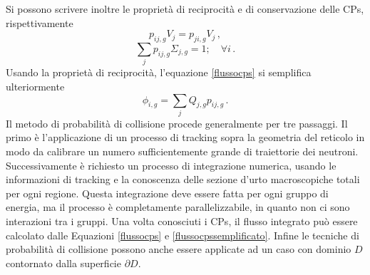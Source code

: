 Si possono scrivere inoltre le proprietà di reciprocità e di conservazione delle 
CPs, rispettivamente
\begin{equation}
p_{ij,g}V_j=p_{ji,g}V_j \,,
\end{equation}
\begin{equation}
\sum_j p_{ij,g}\Sigma_{j,g}=1; \quad \forall i \,.
\end{equation}
Usando la proprietà di reciprocità, l'equazione \eqref{flussocps} si semplifica 
ulteriormente
\begin{equation}
\label{flussocpssemplificato}
\phi_{i,g}=\sum_j Q_{j,g}p_{ij,g} \,.
\end{equation}
Il metodo di probabilità di collisione procede generalmente per tre passaggi.
Il primo è l'applicazione di un processo di tracking sopra la geometria del 
reticolo in modo da calibrare un numero sufficientemente grande di traiettorie 
dei neutroni. Successivamente è richiesto un processo di integrazione numerica, 
usando le informazioni di tracking e la conoscenza delle sezione d'urto 
macroscopiche totali per ogni regione. Questa integrazione deve essere fatta per 
ogni gruppo di energia, ma il processo è completamente parallelizzabile, in 
quanto non ci sono interazioni tra i gruppi. Una volta conosciuti i CPs, il 
flusso integrato può essere calcolato dalle Equazioni \eqref{flussocps} e 
\eqref{flussocpssemplificato}.
Infine le tecniche di probabilità di collisione possono anche essere applicate ad 
un caso con dominio $D$ contornato dalla superficie $\partial D$. 

